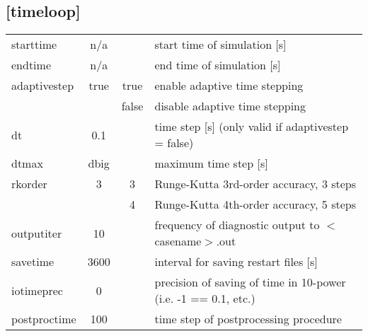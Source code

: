\documentclass[a4paper,10pt]{extarticle}
\begin{document}
\subsection*{[timeloop]}
\tablelasttail{\hline}
\begin{supertabular}{lccl}
starttime     & n/a   &       & start time of simulation [s] \\
endtime       & n/a   &       & end time of simulation [s] \\
adaptivestep  & true  & true  & enable adaptive time stepping \\
              &       & false & disable adaptive time stepping \\
dt            & 0.1   &       & time step [s] (only valid if adaptivestep = false) \\
dtmax         & dbig  &       & maximum time step [s] \\
rkorder       & 3     & 3     & Runge-Kutta 3rd-order accuracy, 3 steps \\
              &       & 4     & Runge-Kutta 4th-order accuracy, 5 steps \\
outputiter    & 10    &       & frequency of diagnostic output to $<$casename$>$.out \\
savetime      & 3600  &       & interval for saving restart files [s] \\
iotimeprec    & 0     &       & precision of saving of time in 10-power (i.e. -1 == 0.1, etc.) \\
postproctime  & 100   &       & time step of postprocessing procedure \\
\end{supertabular}
\end{document}
